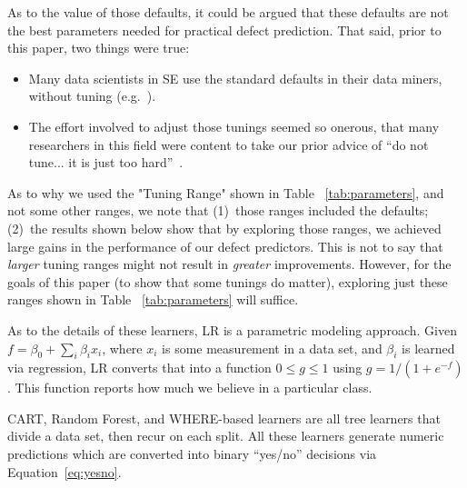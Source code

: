 \documentclass{sig-alternative}
\newcommand{\bi}{\begin{itemize}[leftmargin=0.4cm]}
\newcommand{\ei}{\end{itemize}}
\newcommand{\tab}[1]{Table ~\ref{tab:#1}}
\newcommand{\eq}[1]{Equation~\ref{eq:#1}}
\begin{document}
As to the value of those defaults, it could be argued that these defaults are 
not the best  parameters needed for practical defect prediction.
That said,  prior to this paper, two things were true:
\bi
\item 
Many data scientists in SE use the standard defaults
in their data miners, 
without   tuning (e.g.~\cite{me07b,Moser:2008,herzig2013predicting,zimmermann2007predicting}).
\item
The effort involved to adjust those tunings seemed so onerous, that
many researchers in this field were content to take our prior advice
of ``do not tune... it is just too hard''~\cite{me15:book1}.
\ei
As to why we used the "Tuning Range" shown in \tab{parameters}, and not some other ranges,
we note that (1)~those ranges included the defaults; (2)~the results shown below
show that by exploring those ranges,   we achieved large gains in the performance of our defect predictors.
This is not to say that {\em larger} tuning ranges might not result in {\em greater} improvements.
However, for the goals of this paper (to show that some tunings do matter), exploring
just these ranges shown in \tab{parameters} will suffice.


As to the details of these learners, LR is a parametric
modeling approach. Given $f = \beta_0 + \sum_i\beta_ix_i$,
where $x_i$ is some measurement in a data set, and $\beta_i$
is learned via regression, LR
converts that into a function $0 \le g \le 1$
using $g=1/\left(1+e^{- f}\right)$. This function reports how much
we believe in a particular class. 

CART, Random Forest, and WHERE-based learners are all  tree learners that divide a data set, then recur
on each split.
All these learners
generate numeric predictions which are converted
into binary ``yes/no'' decisions via \eq{yesno}.
\end{document}
